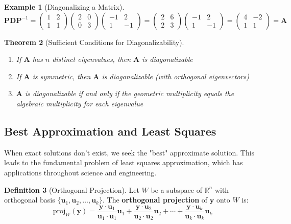 \documentclass[12pt]{article}
\numberwithin{equation}{section}
\newcommand{\vect}[1]{\boldsymbol{#1}}   %
\newcommand{\mat}[1]{\mathbf{#1}}        %
\theoremstyle{plain}
\newtheorem{theorem}{Theorem}[section]
\theoremstyle{definition}
\newtheorem{definition}[theorem]{Definition}
\newtheorem{example}[theorem]{Example}
\theoremstyle{remark}
\begin{document}
\begin{example}[Diagonalizing a Matrix]
$$\mat{P}\mat{D}\mat{P}^{-1} = \begin{pmatrix} 1 & 2 \\ 1 & 1 \end{pmatrix}\begin{pmatrix} 2 & 0 \\ 0 & 3 \end{pmatrix}\begin{pmatrix} -1 & 2 \\ 1 & -1 \end{pmatrix} = \begin{pmatrix} 2 & 6 \\ 2 & 3 \end{pmatrix}\begin{pmatrix} -1 & 2 \\ 1 & -1 \end{pmatrix} = \begin{pmatrix} 4 & -2 \\ 1 & 1 \end{pmatrix} = \mat{A}$$ \checkmark
\end{example}

\begin{theorem}[Sufficient Conditions for Diagonalizability]
\begin{enumerate}
\item If $\mat{A}$ has $n$ distinct eigenvalues, then $\mat{A}$ is diagonalizable
\item If $\mat{A}$ is symmetric, then $\mat{A}$ is diagonalizable (with orthogonal eigenvectors)
\item $\mat{A}$ is diagonalizable if and only if the geometric multiplicity equals the algebraic multiplicity for each eigenvalue
\end{enumerate}
\end{theorem}

\subsection{Best Approximation and Least Squares}

When exact solutions don't exist, we seek the "best" approximate solution. This leads to the fundamental problem of least squares approximation, which has applications throughout science and engineering.

\begin{definition}[Orthogonal Projection]
Let $W$ be a subspace of $\mathbb{R}^n$ with orthogonal basis $\{\vect{u}_1, \vect{u}_2, \ldots, \vect{u}_k\}$. The \textbf{orthogonal projection} of $\vect{y}$ onto $W$ is:
$$\text{proj}_W(\vect{y}) = \frac{\vect{y} \cdot \vect{u}_1}{\vect{u}_1 \cdot \vect{u}_1}\vect{u}_1 + \frac{\vect{y} \cdot \vect{u}_2}{\vect{u}_2 \cdot \vect{u}_2}\vect{u}_2 + \cdots + \frac{\vect{y} \cdot \vect{u}_k}{\vect{u}_k \cdot \vect{u}_k}\vect{u}_k$$
\end{definition}
\end{document}
